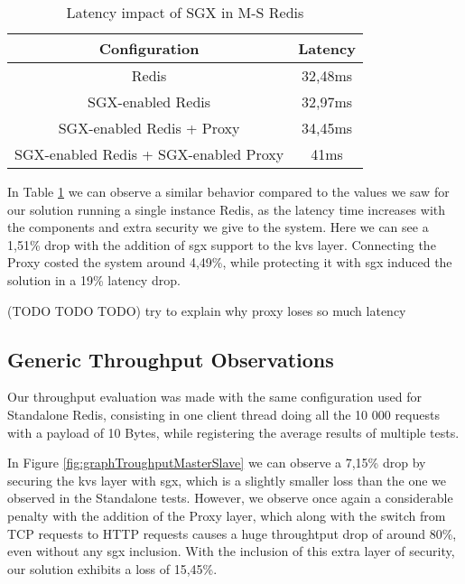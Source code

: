 \begin{table}[ht]
	\caption{Latency impact of SGX in M-S Redis} %
	\centering %
	\begin{tabular}{c c} %
		\hline\hline %
		\textbf{Configuration} & \textbf{Latency} \\ [0.5ex] %
		\hline
		Redis & 32,48ms\\
		\hline
		SGX-enabled Redis & 32,97ms \\
		\hline
		SGX-enabled Redis + Proxy & 34,45ms \\
		\hline %
		SGX-enabled Redis + SGX-enabled Proxy & 41ms\\ [1ex] %
		\hline %
	\end{tabular}
	\label{table:latencyMasterSlaveRedis} %
\end{table}

In Table \ref{table:latencyMasterSlaveRedis} we can observe a similar behavior compared to the values we saw for our solution running a single instance Redis, as the latency time increases with the components and extra security we give to the system. Here we can see a 1,51\% drop with the addition of \gls{sgx} support to the \gls{kvs} layer. Connecting the Proxy costed the system around 4,49\%, while protecting it with \gls{sgx} induced the solution in a 19\% latency drop.

(TODO TODO TODO) try to explain why proxy loses so much latency

\subsection{Generic Throughput Observations}
Our throughput evaluation was made with the same configuration used for Standalone Redis, consisting in one client thread doing all the 10 000 requests with a payload of 10 Bytes, while registering the average results of multiple tests.

In Figure \ref{fig:graphTroughputMasterSlave} we can observe a 7,15\% drop by securing the \gls{kvs} layer with \gls{sgx}, which is a slightly smaller loss than the one we observed in the Standalone tests. However, we observe once again a considerable penalty with the addition of the Proxy layer, which along with the switch from TCP requests to HTTP requests causes a huge throughtput drop of around 80\%, even without any \gls{sgx} inclusion. With the inclusion of this extra layer of security, our solution exhibits a loss of 15,45\%.

